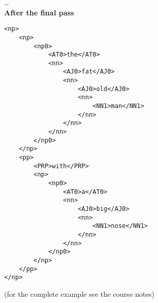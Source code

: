 \ldots \\
\textbf{After the final pass}
\lstset{escapechar=@,style=xmlish}
\begin{lstlisting}
<np>
	<np>
		<np0>
			<AT0>the</AT0>
			<nn>
				<AJ0>fat</AJ0>
				<nn>
					<AJ0>old</AJ0>
					<nn>
						<NN1>man</NN1>
					</nn>
				</nn>
			</nn>
		</np0>
	</np>
	<pp>
		<PRP>with</PRP>
		<np>
			<np0>
				<AT0>a</AT0>
				<nn>
					<AJ0>big</AJ0>
					<nn>
						<NN1>nose</NN1>
					</nn>
				</nn>
			</np0>
		</np>
	</pp>
</np>
\end{lstlisting}
(for the complete example see the course notes)